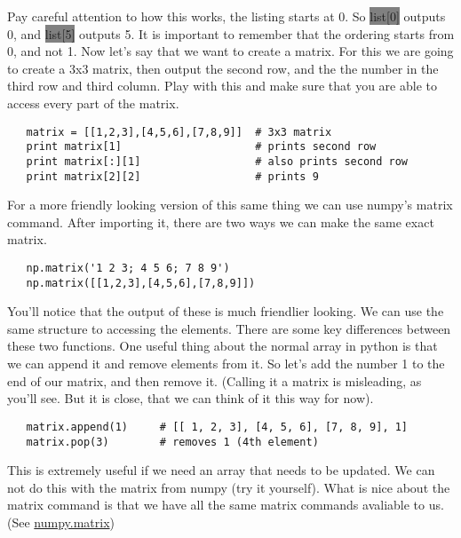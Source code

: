 \documentclass[11pt]{article}   %
\newcommand{\gray}[1]{\colorbox{gray}{#1}}
\begin{document}
Pay careful attention to how this works, the listing starts at 0.  So \gray{list[0]} outputs 0, and \gray{list[5]} outputs 5.  It is important to remember that the ordering starts
from 0, and not 1.  Now let's say that we want to create a matrix.  For this we are going to create a 3x3 matrix, then output the second row, and the the number in the third row and third 
column. Play with this and make sure that you are able to access every part of the matrix.  
\begin{tcolorbox}
   \begin{lstlisting}
   matrix = [[1,2,3],[4,5,6],[7,8,9]]  # 3x3 matrix
   print matrix[1]                     # prints second row
   print matrix[:][1]                  # also prints second row
   print matrix[2][2]                  # prints 9
   \end{lstlisting}
\end{tcolorbox}
For a more friendly looking version of this same thing we can use numpy's matrix command.  After importing it, there are two ways we can make the same exact matrix.
\begin{tcolorbox}
   \begin{lstlisting}
   np.matrix('1 2 3; 4 5 6; 7 8 9')
   np.matrix([[1,2,3],[4,5,6],[7,8,9]])
   \end{lstlisting}
\end{tcolorbox}
You'll notice that the output of these is much friendlier looking.  We can use the same structure to accessing the elements.  There are some key differences between these two functions.
One useful thing about the normal array in python is that we can append it and remove elements from it.  So let's add the number 1 to the end of our matrix, and then remove it.  (Calling
it a matrix is misleading, as you'll see.  But it is close, that we can think of it this way for now).
\begin{tcolorbox}
   \begin{lstlisting}
   matrix.append(1)     # [[ 1, 2, 3], [4, 5, 6], [7, 8, 9], 1]
   matrix.pop(3)        # removes 1 (4th element)
   \end{lstlisting}
\end{tcolorbox}
This is extremely useful if we need an array that needs to be updated.  We can not do this with the matrix from numpy (try it yourself).  What is nice about the matrix command is that 
we have all the same matrix commands avaliable to us. (See \href{http://docs.scipy.org/doc/numpy/reference/generated/numpy.matrix.html}{numpy.matrix})
\end{document}
